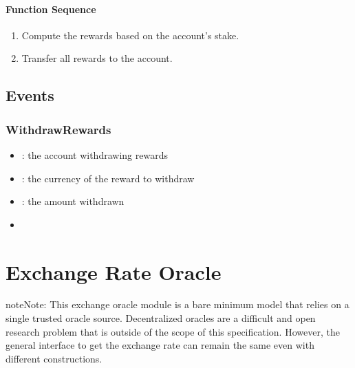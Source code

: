 \documentclass[a4paper,10pt,english]{sphinxmanual}
\begin{document}
\subsubsection{Function Sequence}
\label{\detokenize{spec/fee:id7}}\begin{enumerate}
%
\item {} 
Compute the rewards based on the account’s stake.

\item {} 
Transfer all rewards to the account.

\end{enumerate}


\section{Events}
\label{\detokenize{spec/fee:events}}

\subsection{WithdrawRewards}
\label{\detokenize{spec/fee:id8}}


\begin{itemize}
\item {} 
: the account withdrawing rewards

\item {} 
: the currency of the reward to withdraw

\item {} 
: the amount withdrawn

\end{itemize}

\begin{itemize}
\item {} 
{\hyperref[\detokenize{spec/fee:withdrawrewards}]{}}

\end{itemize}


\chapter{Exchange Rate Oracle}
\label{\detokenize{spec/oracle:exchange-rate-oracle}}\label{\detokenize{spec/oracle:oracle}}\label{\detokenize{spec/oracle::doc}}
\begin{sphinxadmonition}{note}{Note:}
This exchange oracle module is a bare minimum model that relies on a single trusted oracle source. Decentralized oracles are a difficult and open research problem that is outside of the scope of this specification. However, the general interface to get the exchange rate can remain the same even with different constructions.
\end{sphinxadmonition}
\end{document}
